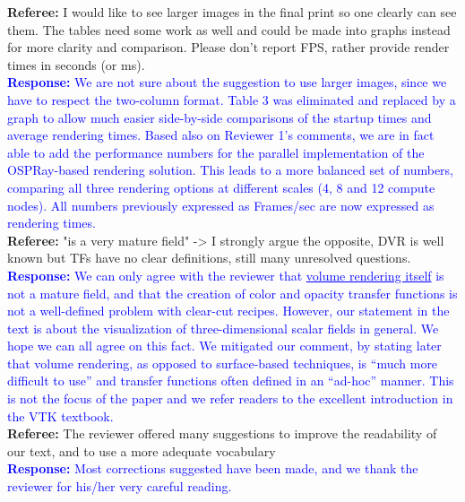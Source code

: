 \documentclass[]{article}
\begin{document}
\textbf{Referee:} I would like to see larger images in the final print so one clearly can see them. The tables need some work as well and could be made into graphs instead for more clarity and comparison. Please don't report FPS, rather provide render times in seconds (or ms). \\

\textcolor{blue}{\textbf{Response:} We are not sure about the suggestion to use larger images, since we have to respect the two-column format. Table 3 was eliminated and replaced by a graph to allow much easier side-by-side comparisons of the startup times and average rendering times. Based also on Reviewer 1's comments, we are in fact able to add the performance numbers for the parallel implementation of the OSPRay-based rendering solution. This leads to a more balanced set of numbers, comparing all three rendering options at different scales (4, 8 and 12 compute nodes). All numbers previously expressed as Frames/sec are now expressed as rendering times.} \\

\textbf{Referee:} "is a very mature field" -> I strongly argue the opposite, DVR is well known but TFs have no clear definitions, still many unresolved questions. \\

\textcolor{blue}{\textbf{Response:} We can only agree with the reviewer that \underline{volume rendering itself} is not a mature field, and that the creation of color and opacity transfer functions is not a well-defined problem with clear-cut recipes. However, our statement in the text is about the visualization of three-dimensional scalar fields in general. We hope we can all agree on this fact. We mitigated our  comment, by stating later that volume rendering, as opposed to surface-based techniques, is “much more difficult to use” and transfer functions often defined in an “ad-hoc” manner. This is not the focus of the paper and we refer readers  to the excellent introduction in the VTK textbook.} \\

\textbf{Referee:} The reviewer offered many suggestions to improve the readability of our text, and to use a more adequate vocabulary \\

\textcolor{blue}{\textbf{Response:} Most corrections suggested have been made, and we thank the reviewer for his/her very careful reading.} \\

 

\end{document}

